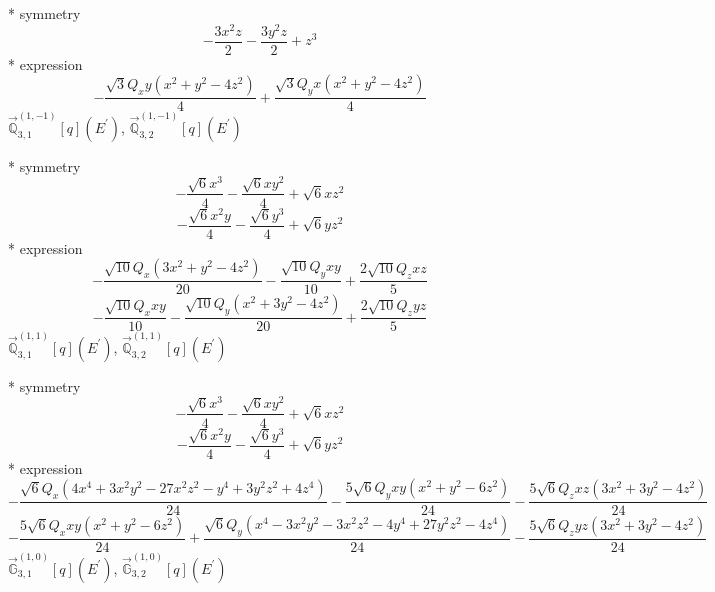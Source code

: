 \documentclass[fleqn,8pt]{jsarticle}
\begin{document}
\noindent\quad ** symmetry
\begin{dmath*}
- \frac{3 x^{2} z}{2} - \frac{3 y^{2} z}{2} + z^{3}
\end{dmath*}
\noindent\quad ** expression
\begin{dmath*}
- \frac{\sqrt{3} Q_{x} y \left(x^{2} + y^{2} - 4 z^{2}\right)}{4} + \frac{\sqrt{3} Q_{y} x \left(x^{2} + y^{2} - 4 z^{2}\right)}{4}
\end{dmath*}
\noindent\quad $\vec{\mathbb{Q}}_{3,1}^{(1,-1)}[q](E^{\prime})$, $\vec{\mathbb{Q}}_{3,2}^{(1,-1)}[q](E^{\prime})$

\noindent\quad ** symmetry
\begin{dmath*}
- \frac{\sqrt{6} x^{3}}{4} - \frac{\sqrt{6} x y^{2}}{4} + \sqrt{6} x z^{2}
\end{dmath*}
\begin{dmath*}
- \frac{\sqrt{6} x^{2} y}{4} - \frac{\sqrt{6} y^{3}}{4} + \sqrt{6} y z^{2}
\end{dmath*}
\noindent\quad ** expression
\begin{dmath*}
- \frac{\sqrt{10} Q_{x} \left(3 x^{2} + y^{2} - 4 z^{2}\right)}{20} - \frac{\sqrt{10} Q_{y} x y}{10} + \frac{2 \sqrt{10} Q_{z} x z}{5}
\end{dmath*}
\begin{dmath*}
- \frac{\sqrt{10} Q_{x} x y}{10} - \frac{\sqrt{10} Q_{y} \left(x^{2} + 3 y^{2} - 4 z^{2}\right)}{20} + \frac{2 \sqrt{10} Q_{z} y z}{5}
\end{dmath*}
\noindent\quad $\vec{\mathbb{Q}}_{3,1}^{(1,1)}[q](E^{\prime})$, $\vec{\mathbb{Q}}_{3,2}^{(1,1)}[q](E^{\prime})$

\noindent\quad ** symmetry
\begin{dmath*}
- \frac{\sqrt{6} x^{3}}{4} - \frac{\sqrt{6} x y^{2}}{4} + \sqrt{6} x z^{2}
\end{dmath*}
\begin{dmath*}
- \frac{\sqrt{6} x^{2} y}{4} - \frac{\sqrt{6} y^{3}}{4} + \sqrt{6} y z^{2}
\end{dmath*}
\noindent\quad ** expression
\begin{dmath*}
- \frac{\sqrt{6} Q_{x} \left(4 x^{4} + 3 x^{2} y^{2} - 27 x^{2} z^{2} - y^{4} + 3 y^{2} z^{2} + 4 z^{4}\right)}{24} - \frac{5 \sqrt{6} Q_{y} x y \left(x^{2} + y^{2} - 6 z^{2}\right)}{24} - \frac{5 \sqrt{6} Q_{z} x z \left(3 x^{2} + 3 y^{2} - 4 z^{2}\right)}{24}
\end{dmath*}
\begin{dmath*}
- \frac{5 \sqrt{6} Q_{x} x y \left(x^{2} + y^{2} - 6 z^{2}\right)}{24} + \frac{\sqrt{6} Q_{y} \left(x^{4} - 3 x^{2} y^{2} - 3 x^{2} z^{2} - 4 y^{4} + 27 y^{2} z^{2} - 4 z^{4}\right)}{24} - \frac{5 \sqrt{6} Q_{z} y z \left(3 x^{2} + 3 y^{2} - 4 z^{2}\right)}{24}
\end{dmath*}
\noindent\quad $\vec{\mathbb{G}}_{3,1}^{(1,0)}[q](E^{\prime})$, $\vec{\mathbb{G}}_{3,2}^{(1,0)}[q](E^{\prime})$
\end{document}
